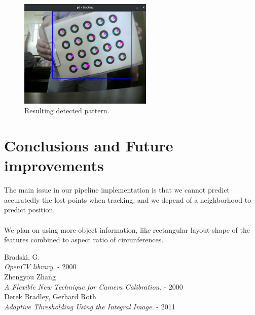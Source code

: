 \documentclass[journal]{IEEEtran}
\begin{document}
%
\begin{figure}[H]
\centering
\includegraphics[width=2.5in]{_img/img_report2_pattern.png}
\caption{Resulting detected pattern.}
\end{figure}
%
\section{Conclusions and Future improvements}
The main issue in our pipeline implementation is that we cannot predict accuratedly the lost points when tracking, and we depend of a neighborhood to predict position.
\\
\\
We plan on using more object information, like rectangular layout shape of the features combined to aspect ratio of circunferences.


\begin{thebibliography}{1}

  Bradski, G. \\
  \textit{OpenCV library.} - 2000
\\
  Zhengyou Zhang \\
  \textit{A Flexible New Technique for Camera Calibration.} - 2000
\\
  Derek Bradley, Gerhard Roth \\
  \textit{Adaptive Thresholding Using the Integral Image.} - 2011


\end{thebibliography}
\end{document}

